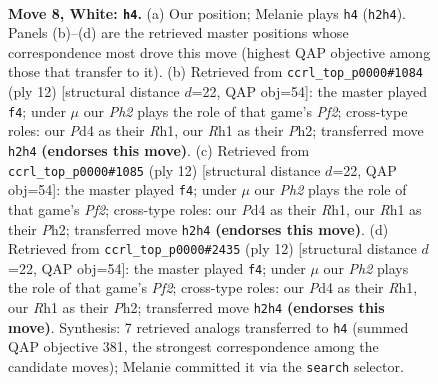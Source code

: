 \documentclass[11pt]{article}
\begin{document}
\begin{figure}[p]\centering
\begin{subfigure}{0.46\textwidth}\centering
\resizebox{\linewidth}{!}{%
\newchessgame
\chessboard[
  setfen={rnb1k2r/1ppnqppp/p3p3/3pP3/3P1P2/2N5/PPP3PP/R2QKBNR w KQkq - 0 8},
  showmover=false,
  pgfstyle=straightmove, color=movearrow, markmove={h2-h4}
]}
\caption{}
\end{subfigure}\hfill
\begin{subfigure}{0.46\textwidth}\centering
\resizebox{\linewidth}{!}{%
\newchessgame
\chessboard[
  setfen={rnb1k2r/pppnqppp/4p3/3pP3/3P4/2N5/PPP2PPP/R2QKBNR w KQkq - 0 7},
  showmover=false,
  pgfstyle=straightmove, color=movearrow, markmove={f2-f4}
]}
\caption{}
\end{subfigure}
\\[4pt]
\begin{subfigure}{0.46\textwidth}\centering
\resizebox{\linewidth}{!}{%
\newchessgame
\chessboard[
  setfen={rnb1k2r/pppnqppp/4p3/3pP3/3P4/2N5/PPP2PPP/R2QKBNR w KQkq - 0 7},
  showmover=false,
  pgfstyle=straightmove, color=movearrow, markmove={f2-f4}
]}
\caption{}
\end{subfigure}\hfill
\begin{subfigure}{0.46\textwidth}\centering
\resizebox{\linewidth}{!}{%
\newchessgame
\chessboard[
  setfen={rnb1k2r/pppnqppp/4p3/3pP3/3P4/2N5/PPP2PPP/R2QKBNR w KQkq - 0 7},
  showmover=false,
  pgfstyle=straightmove, color=movearrow, markmove={f2-f4}
]}
\caption{}
\end{subfigure}
\caption{\textbf{Move 8, White: \texttt{h4}.} (a) Our position; Melanie plays \texttt{h4} (\texttt{h2h4}). Panels (b)--(d) are the retrieved master positions whose correspondence most drove this move (highest QAP objective among those that transfer to it). (b) Retrieved from \texttt{ccrl\_top\_p0000\#1084} (ply 12) [structural distance $d$=22, QAP obj=54]: the master played \texttt{f4}; under $\mu$ our \emph{Ph2} plays the role of that game's \emph{Pf2}; cross-type roles: our \emph{P}d4 as their \emph{R}h1, our \emph{R}h1 as their \emph{P}h2; transferred move \texttt{h2h4} \textbf{(endorses this move)}. (c) Retrieved from \texttt{ccrl\_top\_p0000\#1085} (ply 12) [structural distance $d$=22, QAP obj=54]: the master played \texttt{f4}; under $\mu$ our \emph{Ph2} plays the role of that game's \emph{Pf2}; cross-type roles: our \emph{P}d4 as their \emph{R}h1, our \emph{R}h1 as their \emph{P}h2; transferred move \texttt{h2h4} \textbf{(endorses this move)}. (d) Retrieved from \texttt{ccrl\_top\_p0000\#2435} (ply 12) [structural distance $d$=22, QAP obj=54]: the master played \texttt{f4}; under $\mu$ our \emph{Ph2} plays the role of that game's \emph{Pf2}; cross-type roles: our \emph{P}d4 as their \emph{R}h1, our \emph{R}h1 as their \emph{P}h2; transferred move \texttt{h2h4} \textbf{(endorses this move)}. Synthesis: 7 retrieved analogs transferred to \texttt{h4} (summed QAP objective 381, the strongest correspondence among the candidate moves); Melanie committed it via the \texttt{search} selector.}
\label{fig:thought-m14}
\end{figure}
\end{document}
